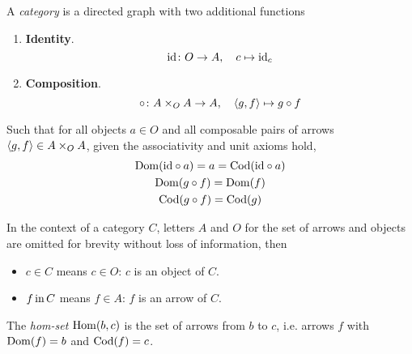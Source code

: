 \begin{definition}[Category]
    A \textit{category} is a directed graph with two additional functions
    \begin{enumerate}
        \item \textbf{Identity}.
        \begin{equation}
            \mathrm{id} \colon O \to A, \quad c \mapsto \mathrm{id}_c
        \end{equation}
        \item \textbf{Composition}.
        \begin{equation}
            \circ \colon A \times_{O} A \to A, \quad \langle g, f \rangle \mapsto g \circ f
        \end{equation}
    \end{enumerate}
    
    Such that for all objects $a \in O$ and all composable pairs of arrows $\langle g, f \rangle \in A \times_{O} A$, given the associativity and unit axioms hold,
    \begin{gather}
        \mathrm{Dom}(\mathrm{id} \circ a) = a = \mathrm{Cod}(\mathrm{id} \circ a) \\
        \mathrm{Dom}(g \circ f) = \mathrm{Dom}(f) \\
        \mathrm{Cod}(g \circ f) = \mathrm{Cod}(g)
    \end{gather}
\end{definition}

\begin{remark}
    In the context of a category $C$, letters $A$ and $O$ for the set of arrows and objects are omitted for brevity without loss of information, then
    \begin{itemize}
        \item $c \in C$ means $c \in O$: $c$ is an object of $C$.
        \item $f \operatorname{\mathrm{in}} C$ means $f \in A$: $f$ is an arrow of $C$.
    \end{itemize}
\end{remark}

\begin{definition}
    The \textit{hom-set} $\mathrm{Hom}(b, c)$ is the set of arrows from $b$ to $c$, i.e. arrows $f$ with $\mathrm{Dom}(f) = b$ and $\mathrm{Cod}(f) = c$.
\end{definition}

